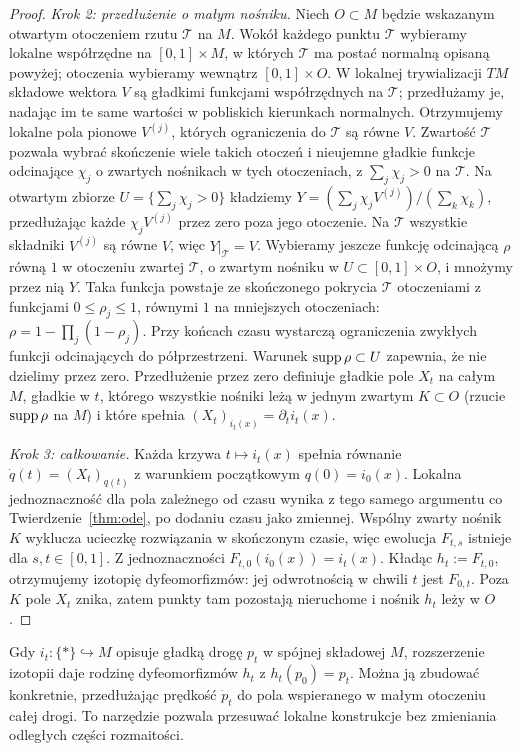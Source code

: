 \begin{proof}
\emph{Krok 2: przedłużenie o małym nośniku.}
Niech $O\subset M$ będzie wskazanym otwartym otoczeniem
rzutu $\mathcal T$ na $M$. Wokół każdego punktu
$\mathcal T$ wybieramy lokalne współrzędne na
$[0,1]\times M$, w których $\mathcal T$ ma postać
normalną opisaną powyżej; otoczenia wybieramy wewnątrz
$[0,1]\times O$. W lokalnej trywializacji $TM$
składowe wektora $V$ są gładkimi funkcjami współrzędnych
na $\mathcal T$; przedłużamy je, nadając im te same
wartości w pobliskich kierunkach normalnych.
Otrzymujemy lokalne pola pionowe $V^{(j)}$, których
ograniczenia do $\mathcal T$ są równe $V$.
Zwartość $\mathcal T$ pozwala wybrać skończenie wiele
takich otoczeń i nieujemne gładkie funkcje odcinające $\chi_j$
o zwartych nośnikach w tych otoczeniach, z
$\sum_j\chi_j>0$ na $\mathcal T$.
Na otwartym zbiorze $U=\{\sum_j\chi_j>0\}$ kładziemy
$Y=(\sum_j\chi_j V^{(j)})/(\sum_k\chi_k)$,
przedłużając każde $\chi_j V^{(j)}$ przez zero poza jego otoczenie.
Na $\mathcal T$ wszystkie składniki $V^{(j)}$ są równe
$V$, więc $Y|_{\mathcal T}=V$.
Wybieramy jeszcze funkcję odcinającą $\rho$ równą $1$ w
otoczeniu zwartej $\mathcal T$, o zwartym nośniku
w $U\subset[0,1]\times O$, i mnożymy przez nią $Y$.
Taka funkcja powstaje ze skończonego pokrycia $\mathcal T$
otoczeniami z funkcjami $0\le\rho_j\le1$, równymi $1$
na mniejszych otoczeniach: $\rho=1-\prod_j(1-\rho_j)$.
Przy końcach czasu wystarczą ograniczenia zwykłych funkcji
odcinających do półprzestrzeni. Warunek $\operatorname{supp}\rho\subset U$
zapewnia, że nie dzielimy przez zero.
Przedłużenie przez zero definiuje gładkie pole $X_t$
na całym $M$, gładkie w $t$, którego wszystkie nośniki
leżą w jednym zwartym $K\subset O$ (rzucie $\operatorname{supp}\rho$ na $M$)
i które spełnia
$(X_t)_{i_t(x)}=\partial_t i_t(x)$.

\emph{Krok 3: całkowanie.} Każda krzywa
$t\mapsto i_t(x)$ spełnia równanie
$\dot q(t)=(X_t)_{q(t)}$ z warunkiem początkowym
$q(0)=i_0(x)$. Lokalna jednoznaczność dla pola zależnego
od czasu wynika z tego samego argumentu co
Twierdzenie~\ref{thm:ode}, po dodaniu czasu jako zmiennej.
Wspólny zwarty nośnik $K$ wyklucza ucieczkę rozwiązania
w skończonym czasie, więc ewolucja $F_{t,s}$ istnieje
dla $s,t\in[0,1]$. Z jednoznaczności
$F_{t,0}(i_0(x))=i_t(x)$. Kładąc $h_t:=F_{t,0}$,
otrzymujemy izotopię dyfeomorfizmów:
jej odwrotnością w chwili $t$ jest $F_{0,t}$.
Poza $K$ pole $X_t$ znika, zatem punkty tam pozostają
nieruchome i nośnik $h_t$ leży w $O$.
\end{proof}

\begin{przyklad}
Gdy $i_t\colon\{*\}\hookrightarrow M$ opisuje gładką drogę
$p_t$ w spójnej składowej $M$, rozszerzenie izotopii daje
rodzinę dyfeomorfizmów $h_t$ z $h_t(p_0)=p_t$.
Można ją zbudować konkretnie, przedłużając prędkość
$\dot p_t$ do pola wspieranego w małym otoczeniu całej drogi.
To narzędzie pozwala przesuwać lokalne konstrukcje
bez zmieniania odległych części rozmaitości.
\end{przyklad}

